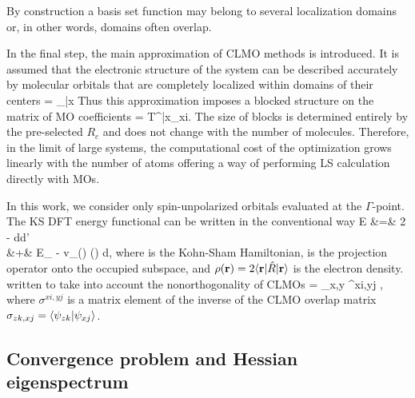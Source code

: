 \documentclass[aps,prl,twocolumn,reprint,amsmath,amssymb]{revtex4-1}
\begin{document}
By construction a basis set function may belong to several localization domains or, in other words, domains often overlap. 

In the final step, the main approximation of CLMO methods is introduced. It is assumed that the electronic structure of the system can be described accurately by molecular orbitals that are completely localized within domains of their centers
%
\bea
{} = _{\bar{x}} 
\label{eq:LMO}
\eea
%
Thus this approximation imposes a blocked structure on the matrix of MO coefficients
\bea
{} =  {T^{\bar{x}\mu}}_{xi}.
\label{eq:LMOproj}
\eea
%
The size of blocks is determined entirely by the pre-selected $R_{c}$ and does not change with the number of molecules. Therefore, in the limit of large systems, the computational cost of the optimization grows linearly with the number of atoms offering a way of performing LS calculation directly with MOs. %

In this work, we consider only spin-unpolarized orbitals evaluated at the $\Gamma$-point. The KS DFT energy functional can be written in the conventional way 
\bea
E &=& 2 \trace \left[ \op{R} \op{H} \right] -  \int\int {}d\br d\br' \nonumber \\
 &+& E_{} - \int v_{}(\br) \rho(\br) d\br,
\eea
%
where  is the Kohn-Sham Hamiltonian,  is the projection operator onto the occupied subspace, and $\rho(\mathbf{r}) = 2\langle \mathbf{r} \vert\hat{R}\vert \mathbf{r} \rangle$ is the electron density.  written to take into account the nonorthogonality of CLMOs
\bea \label{eq:dm}
 = \sum_{x,y}  \sigma^{xi,yj} ,
\eea
%
where $\sigma^{xi,yj}$ is a matrix element of the inverse of the CLMO overlap matrix $\sigma_{zk,xj} = \langle  \psi_{zk} \vert  \psi_{xj} \rangle $.

\subsection{Convergence problem and Hessian eigenspectrum}
\end{document}
